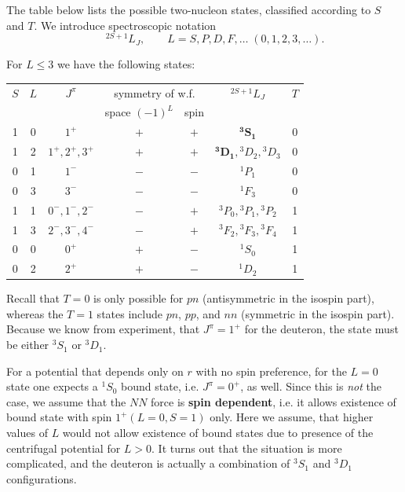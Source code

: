\documentclass[11pt,a4paper]{article}
\begin{document}
The table below lists the possible two-nucleon states, classified according to $S$ and $T$.
We introduce spectroscopic notation 
\[
\qquad {}^{2S+1}L_J, \qquad L=S,P,D,F,\dots \;(0,1,2,3,\dots).
\]

For $L\le 3$ we have the following states:

\begin{center}
\renewcommand{\arraystretch}{1.3}
\begin{tabular}{c c c c c c c}
\hline
$S$ & $L$ & $J^\pi$ & \multicolumn{2}{c}{symmetry of w.f.} & ${}^{2S+1}L_J$ & $T$ \\
 & & & space $(-1)^L$ & spin & & \\
\hline
1 & 0 & $1^+$ & $+$ & $+$ & $\mathbf{{}^3S_1}$ & 0 \\
1 & 2 & $1^+,2^+,3^+$ & $+$ & $+$ & $\mathbf{{}^3D_1},{}^3D_2,{}^3D_3$ & 0 \\
0 & 1 & $1^-$ & $-$ & $-$ & ${}^1P_1$ & 0 \\
0 & 3 & $3^-$ & $-$ & $-$ & ${}^1F_3$ & 0 \\
\hline
1 & 1 & $0^-,1^-,2^-$ & $-$ & $+$ & ${}^3P_0,{}^3P_1,{}^3P_2$ & 1 \\
1 & 3 & $2^-,3^-,4^-$ & $-$ & $+$ & ${}^3F_2,{}^3F_3,{}^3F_4$ & 1 \\
0 & 0 & $0^+$ & $+$ & $-$ & ${}^1S_0$ & 1 \\
0 & 2 & $2^+$ & $+$ & $-$ & ${}^1D_2$ & 1 \\
\hline
\end{tabular}
\end{center}
Recall that $T=0$ is only possible for $pn$ (antisymmetric in the isospin part), whereas the $T=1$ states include $pn$, $pp$, and $nn$ (symmetric in the isospin part).
Because we know from experiment, that $J^\pi=1^+$ for the deuteron, the state must be either ${}^3S_1$ or ${}^3D_1$.

For a potential that depends only on $r$ with no spin preference, for the $L=0$ state one expects a ${}^1S_0$ bound state, i.e. $J^\pi=0^+$, as well. Since this is \emph{not} the case, we assume that the $NN$
force is \textbf{spin dependent}, i.e. it allows existence of bound state with spin $1^+ (L=0, S=1)$ only. Here we assume, that higher values of $L$ would not allow existence of bound states due to presence of the centrifugal potential for $L>0$. It turns out that the situation is more complicated, and the deuteron is actually a combination of ${}^3S_1$ and ${}^3D_1$ configurations. 
\end{document}
